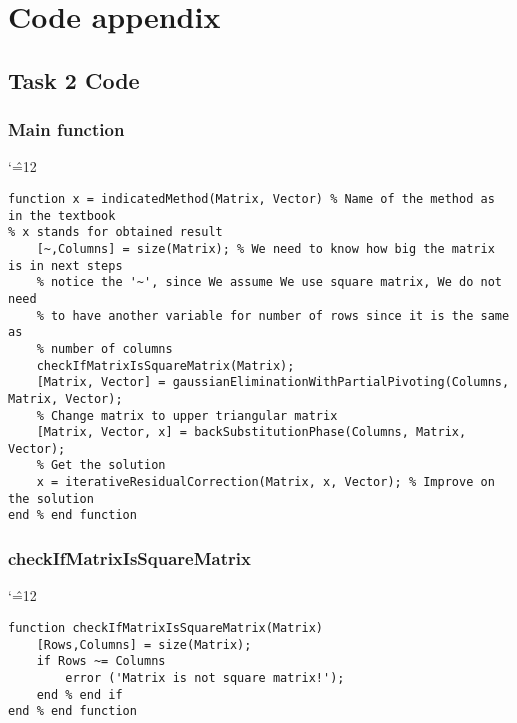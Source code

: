 \documentclass{report}
\newenvironment{simplechar}{%
   \catcode`\^=12
}{}
\begin{document}
\chapter{Code appendix}

\section{Task 2 Code}

\subsection{Main function}
\begin{simplechar}
\begin{lstlisting}
function x = indicatedMethod(Matrix, Vector) % Name of the method as in the textbook
% x stands for obtained result
    [~,Columns] = size(Matrix); % We need to know how big the matrix is in next steps
    % notice the '~', since We assume We use square matrix, We do not need
    % to have another variable for number of rows since it is the same as
    % number of columns
    checkIfMatrixIsSquareMatrix(Matrix);
    [Matrix, Vector] = gaussianEliminationWithPartialPivoting(Columns, Matrix, Vector);
    % Change matrix to upper triangular matrix
    [Matrix, Vector, x] = backSubstitutionPhase(Columns, Matrix, Vector);
    % Get the solution
    x = iterativeResidualCorrection(Matrix, x, Vector); % Improve on the solution
end % end function
\end{lstlisting}
\end{simplechar}

\subsection{checkIfMatrixIsSquareMatrix}
\begin{simplechar}
\begin{lstlisting}
function checkIfMatrixIsSquareMatrix(Matrix)
    [Rows,Columns] = size(Matrix);
    if Rows ~= Columns
        error ('Matrix is not square matrix!');
    end % end if
end % end function
\end{lstlisting}
\end{simplechar}

\newpage
\end{document}
